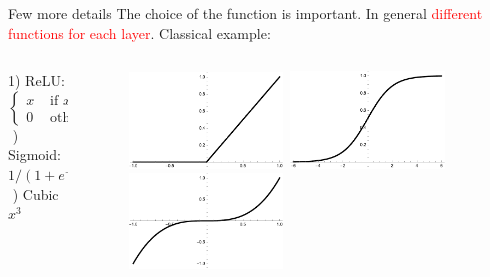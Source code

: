 \documentclass[10pt]{beamer}
\newcommand{\red}[1]{\textcolor{red}{#1}}
\newcommand{\ta}{\left(}
\newcommand{\tc}{\right)}
\renewcommand{\[}{\begin{equation*}}
\renewcommand{\]}{\end{equation*}}
\begin{document}
\begin{frame}{Few more details}
The choice of the function is important. In general \red{different functions for each layer}. 
\pause
Classical example:\\
\begin{columns}
\begin{column}{0.35\textwidth}
1) ReLU: 
$
\begin{cases}
x & \text{ if } x>0\\
0 & \text{ otherwise }
\end{cases}
$\\
$ $  ) Sigmoid: $1/\ta 1+e^{-x}\tc$\\
$ $  ) Cubic $x^3$

\end{column}
\begin{column}{0.5\textwidth}
\begin{figure}
\centering
\includegraphics[width = 0.45\textwidth]{Notes/Figures/relu.pdf}\ 
\includegraphics[width = 0.45\textwidth]{Notes/Figures/sigmoid.pdf}\\
\includegraphics[width = 0.45\textwidth]{Notes/Figures/cubic.pdf}
\end{figure}
\end{column}
\end{columns}

\end{frame}
\end{document}
